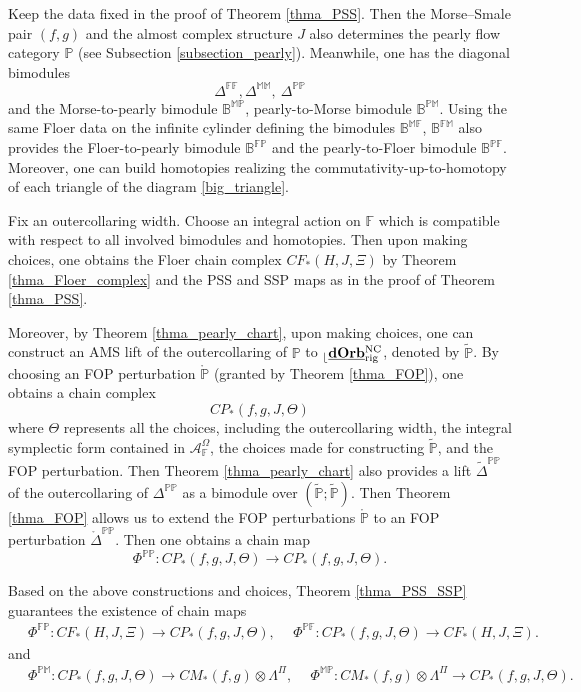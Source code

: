 \documentclass[reqno, 10pt]{amsart}
\numberwithin{equation}{section}
\numberwithin{equation}{section}
\theoremstyle{definition}
\theoremstyle{remark}
\newcommand{\beqn}{\begin{equation*}}
\newcommand{\eeqn}{\end{equation*}}
\newcommand{\mb}{\mathbb}
\newcommand{\mc}{\mathcal}
\renewcommand{\outer}{{}_{\lfloor}}
\newcommand{\uds}[1]{\underline{\smash{#1}}}
\begin{document}
Keep the data fixed in the proof of Theorem \ref{thma_PSS}. Then the Morse--Smale pair $(f, g)$ and the almost complex structure $J$ also determines the pearly flow category $\mb{P}$ (see Subsection \ref{subsection_pearly}). Meanwhile, one has the diagonal bimodules 
\beqn
\mb{\Delta}^{\mb{FF}}, \mb{\Delta}^{\mb{MM}},\ \mb{\Delta}^{\mb{PP}}
\eeqn
and the Morse-to-pearly bimodule $\mb{B}^{\mb{MP}}$, pearly-to-Morse bimodule $\mb{B}^{\mb{PM}}$. Using the same Floer data on the infinite cylinder defining the bimodules $\mb{B}^{\mb{MF}}$, $\mb{B}^{\mb{FM}}$ also provides the Floer-to-pearly bimodule $\mb{B}^{\mb{FP}}$ and the pearly-to-Floer bimodule $\mb{B}^{\mb{PF}}$. Moreover, one can build homotopies realizing the commutativity-up-to-homotopy of each triangle of the diagram \eqref{big_triangle}. 

Fix an outercollaring width. Choose an integral action on ${\mb F}$ which is compatible with respect to all involved bimodules and homotopies. Then upon making choices, one obtains the Floer chain complex $CF_*(H, J, \Xi)$ by Theorem \ref{thma_Floer_complex} and the PSS and SSP maps as in the proof of Theorem \ref{thma_PSS}. 

Moreover, by Theorem \ref{thma_pearly_chart}, upon making choices, one can construct an AMS lift of the outercollaring of ${\mb P}$ to $\outer \uds{\bf dOrb}_{\rm rig}^{\rm NC}$, denoted by $\tilde {\mb P}$. By choosing an FOP perturbation $\mathring {\mb P}$ (granted by Theorem \ref{thma_FOP}), one obtains a chain complex
\beqn
CP_*(f, g, J, \Theta)
\eeqn
where $\Theta$ represents all the choices, including the outercollaring width, the integral symplectic form contained in ${\mc A}_{\mb F}^\Omega$, the choices made for constructing $\tilde {\mb P}$, and the FOP perturbation. Then Theorem \ref{thma_pearly_chart} also provides a lift $\tilde{\mb \Delta}^{\mb{PP}}$ of the outercollaring of $\mb{\Delta}^{\mb{PP}}$ as a bimodule over $(\tilde {\mb P}; \tilde {\mb P})$. Then Theorem \ref{thma_FOP} allows us to extend the FOP perturbations $\mathring {\mb P}$ to an FOP perturbation $\mathring{\mb{\Delta}}^{\mb{PP}}$. Then one obtains a chain map
\beqn
\Phi^{\mb{PP}}: CP_*(f, g, J, \Theta) \to CP_*(f, g, J, \Theta).
\eeqn

Based on the above constructions and choices, Theorem \ref{thma_PSS_SSP} guarantees the existence of chain maps
\begin{align*}
&\ \Phi^{\mb{FP}}: CF_*(H, J, \Xi) \to CP_*(f, g, J, \Theta),\ &\ \Phi^{\mb{PF}}: CP_*(f, g, J, \Theta) \to CF_*(H, J, \Xi).
\end{align*}
and
\begin{align*}
&\ \Phi^{\mb{PM}}: CP_*( f, g, J, \Theta) \to CM_*(f, g) \otimes \Lambda^\Pi,\ &\ \Phi^{\mb{MP}}: CM_*(f, g)\otimes \Lambda^\Pi \to CP_*(f, g, J, \Theta).
\end{align*}
\end{document}
